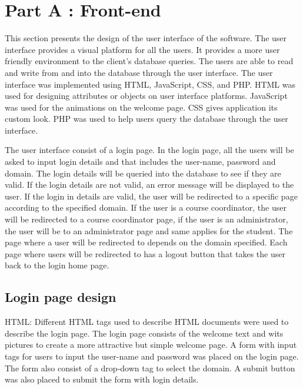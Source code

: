 
\section{Part A : Front-end}

This section presents the design of the user interface of the software. The user interface provides a visual platform for all the users. It provides a more user friendly environment to the client's database queries. The users are able to read and write from and into the database through the user interface. The user interface was implemented using HTML, JavaScript, CSS, and PHP. HTML was used for designing attributes or objects on user interface platforms. JavaScript was used for the animations on the welcome page. CSS gives application its custom look. PHP was used to help users query the database through the user interface. 

The user interface consist of a login page. In the login page, all the users will be asked to input login details and that includes the user-name, password and domain. The login details will be queried into the database to see if they are valid. If the login details are not valid, an error message will be displayed to the user. If the login in details are valid, the user will be redirected to a specific page according to the specified domain. If the user is a course coordinator, the user will be redirected to a course coordinator page, if the user is an administrator, the user will be to an administrator page and same applies for the student. The page where a user will be redirected to depends on the domain specified. Each page where users will be redirected to has a logout button that takes the user back to the login home page. 


\subsection{Login page design}

HTML: Different HTML tags used to describe HTML documents were used to describe the login page. The login page consists of the welcome text and wits pictures to create a more attractive but simple welcome page. A form with input tags for users to input the user-name and password was placed on the login page. The form also consist of a drop-down tag to select the domain. A submit button was also placed to submit the form with login details.


